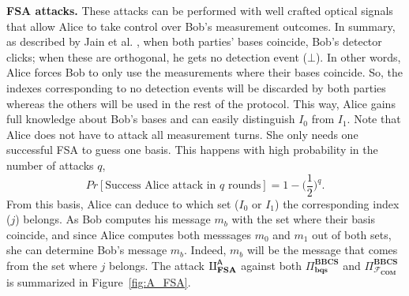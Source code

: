 \noindent\textbf{FSA attacks.} These attacks can be performed with well crafted optical signals that allow Alice to take control over Bob's measurement outcomes. In summary, as described by Jain et al. \cite{JSKEML16}, when both parties' bases coincide, Bob's detector clicks; when these are orthogonal, he gets no detection event ($\bot$). In other words, Alice forces Bob to only use the measurements where their bases coincide. So, the indexes corresponding to no detection events will be discarded by both parties whereas the others will be used in the rest of the protocol. This way, Alice gains full knowledge about Bob's bases and can easily distinguish $I_0$ from $I_1$. Note that Alice does not have to attack all measurement turns. She only needs one successful FSA to guess one basis. This happens with high probability in the number of attacks $q$,
$$Pr[\text{Success Alice attack in }q\text{ rounds} ] = 1 - \bigg(\frac{1}{2}\bigg)^q.$$
From this basis, Alice can deduce to which set ($I_0$ or $I_1$) the corresponding index ($j$) belongs. As Bob computes his message $m_b$ with the set where their basis coincide, and since Alice computes both messsages $m_0$ and $m_1$ out of both sets, she can determine Bob's message $m_b$. Indeed, $m_b$ will be the message that comes from the set where $j$ belongs. The attack $\rotPi^{\mathsf{A}}_{\textbf{FSA}}$ against both $\Pi^{\textbf{BBCS}}_{\textbf{bqs}}$ and $\Pi^{\textbf{BBCS}}_{\mathcal{F}_\textbf{COM}}$ is summarized in Figure~\ref{fig:A_FSA}.

